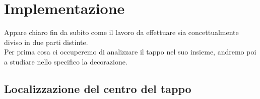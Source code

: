 \section{Implementazione}

Appare chiaro fin da subito come il lavoro da effettuare sia concettualmente diviso in due parti distinte.\\
Per prima cosa ci occuperemo di analizzare il tappo nel suo insieme, andremo poi a studiare nello specifico la decorazione.
\\


\subsection{Localizzazione del centro del tappo}


